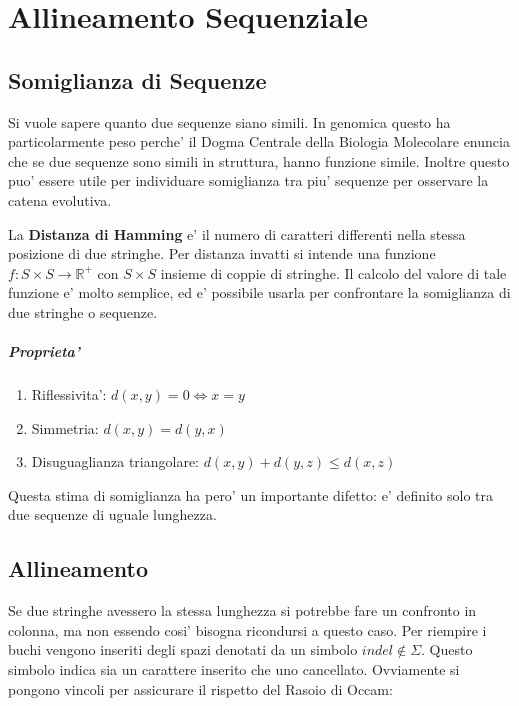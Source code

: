 \chapter{Allineamento Sequenziale}

\section{Somiglianza di Sequenze}

Si vuole sapere quanto due sequenze siano simili. In genomica questo ha particolarmente peso perche' il Dogma Centrale della Biologia Molecolare enuncia che se due sequenze sono simili in struttura, hanno funzione simile.
Inoltre questo puo' essere utile per individuare somiglianza tra piu' sequenze per osservare la catena evolutiva.

La \textbf{Distanza di Hamming} e' il numero di caratteri differenti nella stessa posizione di due stringhe.
Per distanza invatti si intende una funzione $f : S \times S \rightarrow \mathbb{R}^+$ con $S \times S$ insieme di coppie di stringhe.
Il calcolo del valore di tale funzione e' molto semplice, ed e' possibile usarla per confrontare la somiglianza di due stringhe o sequenze.

\paragraph{Proprieta'}

\begin{enumerate}
    \item Riflessivita': $d(x,y) = 0 \Leftrightarrow x = y$
    \item Simmetria: $d(x,y) = d(y,x)$
    \item Disuguaglianza triangolare: $d(x,y) + d(y,z) \leq d(x,z)$
\end{enumerate}

Questa stima di somiglianza ha pero' un importante difetto: e' definito solo tra due sequenze di uguale lunghezza.

\section{Allineamento}

Se due stringhe avessero la stessa lunghezza si potrebbe fare un confronto in colonna, ma non essendo cosi' bisogna ricondursi a questo caso.
Per riempire i buchi vengono inseriti degli spazi denotati da un simbolo $indel \notin \Sigma$.
Questo simbolo indica sia un carattere inserito che uno cancellato.
Ovviamente si pongono vincoli per assicurare il rispetto del Rasoio di Occam:


